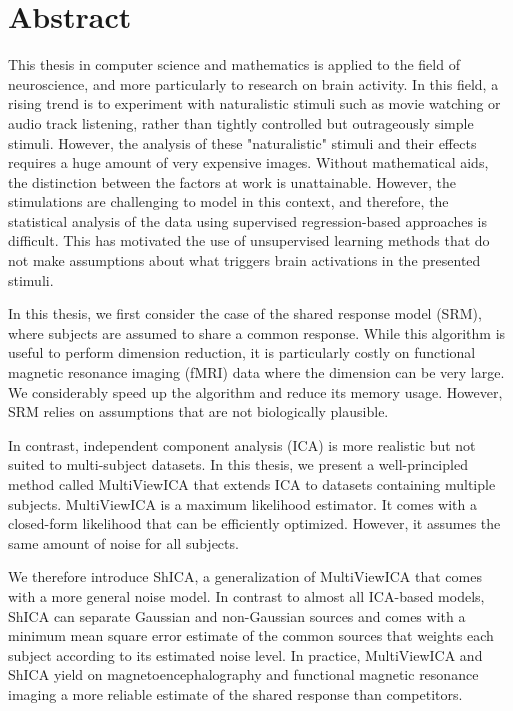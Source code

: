 \begingroup
\let\clearpage\relax
\let\cleardoublepage\relax
\let\cleardoublepage\relax

\chapter*{Abstract}
This thesis in computer science and mathematics is applied to the field of
neuroscience, and more particularly to research on brain activity.
In this field, a rising trend is to experiment with naturalistic stimuli such as movie watching or audio track listening,
rather than tightly controlled but outrageously simple stimuli.
However, the analysis of these "naturalistic" stimuli and their effects requires a huge amount of very expensive images.
Without mathematical aids, the distinction between the factors at work is
unattainable.
However, the stimulations are challenging to model in this context, and therefore, the statistical analysis of the data using supervised regression-based approaches is difficult.
This has motivated the use of unsupervised learning methods that do not make assumptions about what triggers brain activations in the presented stimuli.

In this thesis, we first consider the case of the shared response model (SRM), where
subjects are assumed to share a common response. While this algorithm is useful
to perform dimension reduction, it is particularly costly on functional magnetic
resonance imaging (fMRI) data where the
dimension can be very large. We considerably speed up the
algorithm and reduce its memory usage. However, SRM relies on assumptions that
are not biologically plausible.

In contrast, independent component analysis (ICA) is more realistic but not suited to multi-subject datasets. In this thesis, we present a well-principled method called MultiViewICA that extends ICA to datasets containing multiple subjects.
MultiViewICA is a maximum likelihood estimator. It comes with a closed-form
likelihood that can be efficiently optimized. However, it assumes the same amount of noise for all subjects.

We therefore introduce ShICA, a generalization of MultiViewICA that comes with a more general noise model. In contrast to almost all ICA-based models, ShICA can separate Gaussian and non-Gaussian sources and comes with a minimum mean square error estimate of the common sources that weights each subject according to its estimated noise level.
In practice, MultiViewICA and ShICA yield on magnetoencephalography and functional magnetic resonance imaging a more reliable estimate
of the shared response than competitors.

